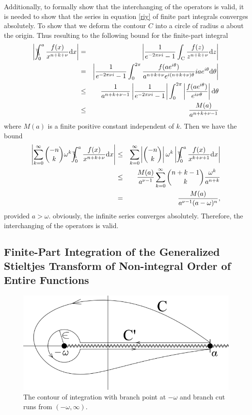 Additionally, to formally show that the interchanging of the operators is valid, it is needed to show that the series in equation \eqref{riy} of finite part integrals converges absolutely. To show that we deform the contour $C$ into a circle of radius $a$ about the origin. Thus resulting to the following bound for the finite-part integral 
\begin{eqnarray}\nonumber
\left|\bbint{0}{a} \frac{f(x)}{x^{n+k+\nu}}\mathrm{d}x\right| &=& \left|\frac{1}{e^{-2\pi\nu i}-1}\int_{\mathrm{C}} \frac{f(z)}{z^{n+k+\nu}} \mathrm{d}z\right|\nonumber \\
&=& \left|\frac{1}{e^{-2\pi\nu i}-1} \int_0^{2\pi} \frac{f(a e^{i\theta})}{a^{n + k + \nu} e^{i(n + k+\nu)\theta}} i a e^{i\theta} \mathrm{d}\theta\right|\nonumber \\
&\leq & \frac{1}{a^{n+k+\nu-1}}\left| \frac{1}{e^{-2\pi\nu i}-1}\right| \int_0^{2\pi} \left|\frac{f(ae^{i\theta})}{e^{i\nu\theta}}\right| \mathrm{d}\theta \nonumber \\
&\leq& \frac{M(a)}{a^{n+k+\nu-1}}
\end{eqnarray}
where $M(a)$ is a finite positive constant independent of $k$.  Then we have the bound
\begin{eqnarray}
\left|\sum_{k=0}^{\infty} \binom{-n}{k} \omega^{k} \bbint{0}{a} \frac{f(x)}{x^{n+k+\nu}}\mathrm{d}x\right|&\leq& \sum_{k=0}^{\infty} \left|\binom{-n}{k}\right| \omega^{k} \left|\bbint{0}{a} \frac{f(x)}{x^{k  +\nu+1}}\mathrm{d}x\right| \nonumber \\
&\leq& \frac{M(a)}{a^{\nu-1}}\sum_{k=0}^{\infty} \binom{n+k-1}{k} \frac{\omega^{ k}}{a^{n+k}} \nonumber \\
&=& \frac{
	M(a)}{a^{\nu-1}(a - \omega)^{n}},
\end{eqnarray}
provided $a>\omega$. obviously, the infinite series converges absolutely.  Therefore, the interchanging of the operators is valid.




\subsection{Finite-Part Integration of the Generalized Stieltjes Transform of
Non-integral Order of Entire Functions}

\begin{figure}
    \centering
    \includegraphics[width=.75\textwidth]{c32.PNG}
    \caption{The contour of integration with branch point at $-\omega$  and  branch  cut  runs  from $(-\omega,\infty)$.}
    \label{ch33}
\end{figure}

